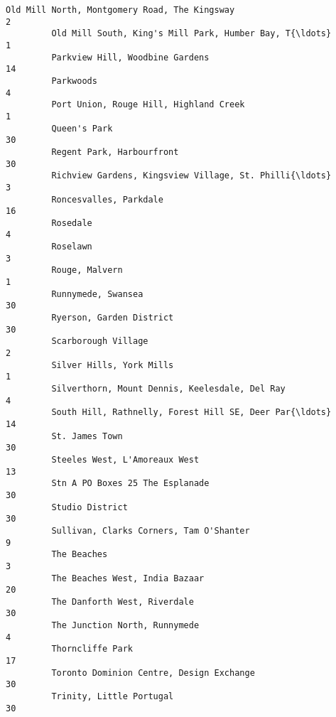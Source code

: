 \documentclass[11pt]{article}
\begin{document}
\begin{Verbatim}[commandchars=\\\{\}]
         Old Mill North, Montgomery Road, The Kingsway                            2   
         Old Mill South, King's Mill Park, Humber Bay, T{\ldots}                       1   
         Parkview Hill, Woodbine Gardens                                         14   
         Parkwoods                                                                4   
         Port Union, Rouge Hill, Highland Creek                                   1   
         Queen's Park                                                            30   
         Regent Park, Harbourfront                                               30   
         Richview Gardens, Kingsview Village, St. Philli{\ldots}                       3   
         Roncesvalles, Parkdale                                                  16   
         Rosedale                                                                 4   
         Roselawn                                                                 3   
         Rouge, Malvern                                                           1   
         Runnymede, Swansea                                                      30   
         Ryerson, Garden District                                                30   
         Scarborough Village                                                      2   
         Silver Hills, York Mills                                                 1   
         Silverthorn, Mount Dennis, Keelesdale, Del Ray                           4   
         South Hill, Rathnelly, Forest Hill SE, Deer Par{\ldots}                      14   
         St. James Town                                                          30   
         Steeles West, L'Amoreaux West                                           13   
         Stn A PO Boxes 25 The Esplanade                                         30   
         Studio District                                                         30   
         Sullivan, Clarks Corners, Tam O'Shanter                                  9   
         The Beaches                                                              3   
         The Beaches West, India Bazaar                                          20   
         The Danforth West, Riverdale                                            30   
         The Junction North, Runnymede                                            4   
         Thorncliffe Park                                                        17   
         Toronto Dominion Centre, Design Exchange                                30   
         Trinity, Little Portugal                                                30   

\end{Verbatim}
\end{document}
